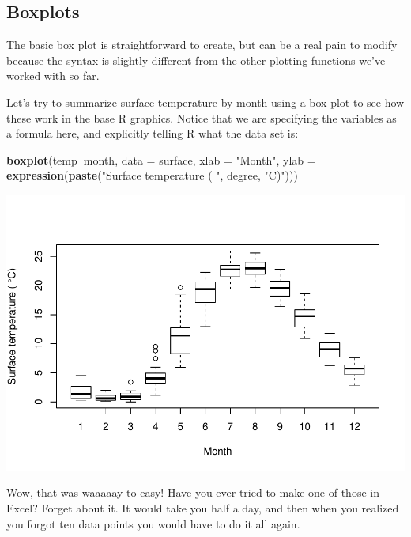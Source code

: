 \documentclass[
]{book}
\newenvironment{Shaded}{\begin{snugshade}}{\end{snugshade}}
\newcommand{\DataTypeTok}[1]{\textcolor[rgb]{0.13,0.29,0.53}{#1}}
\newcommand{\KeywordTok}[1]{\textcolor[rgb]{0.13,0.29,0.53}{\textbf{#1}}}
\newcommand{\NormalTok}[1]{#1}
\newcommand{\OperatorTok}[1]{\textcolor[rgb]{0.81,0.36,0.00}{\textbf{#1}}}
\newcommand{\StringTok}[1]{\textcolor[rgb]{0.31,0.60,0.02}{#1}}
\begin{document}
\hypertarget{boxplots}{%
\subsection{Boxplots}\label{boxplots}}

The basic box plot is straightforward to create, but can be a real pain to modify because the syntax is slightly different from the other plotting functions we've worked with so far.

Let's try to summarize surface temperature by month using a box plot to see how these work in the base R graphics. Notice that we are specifying the variables as a formula here, and explicitly telling R what the data set is:

\begin{Shaded}
\begin{Highlighting}[]
\KeywordTok{boxplot}\NormalTok{(temp}\OperatorTok{~}\NormalTok{month, }\DataTypeTok{data =}\NormalTok{ surface,}
        \DataTypeTok{xlab =} \StringTok{"Month"}\NormalTok{,}
        \DataTypeTok{ylab =} \KeywordTok{expression}\NormalTok{(}\KeywordTok{paste}\NormalTok{(}\StringTok{"Surface temperature ( "}\NormalTok{, degree, }\StringTok{"C)"}\NormalTok{)))}
\end{Highlighting}
\end{Shaded}

\includegraphics{worstr_files/figure-latex/unnamed-chunk-96-1.pdf}

Wow, that was waaaaay to easy! Have you ever tried to make one of those in Excel? Forget about it. It would take you half a day, and then when you realized you forgot ten data points you would have to do it all again.
\end{document}
